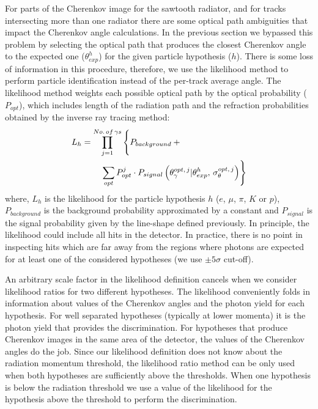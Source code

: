 \documentclass[fleqn,twoside]{article}
\begin{document}
For parts of the Cherenkov image for the sawtooth radiator, and for
tracks intersecting more than one radiator there are some
optical path ambiguities that impact the Cherenkov angle calculations.
In the previous section we bypassed this problem by selecting the optical
path that produces the closest Cherenkov angle to the expected one
($\theta^h_{exp}$) for the given particle hypothesis ($h$).
There is some loss of information in this procedure, therefore,
we use the likelihood method to perform particle identification
instead of the per-track average angle.
The likelihood method weights each possible optical path
by the optical probability ($P_{opt}$),
which includes length of the radiation path
and the refraction probabilities obtained by the inverse ray tracing method:
\begin{eqnarray*}
L_h = \prod_{j=1}^{No.\,of\,\gamma s} \left\{
P_{{background}} +  \hbox{\qquad\qquad} \phantom{\sum_{opt} P_{opt}^j} \right. \\
   \left. \sum_{opt} P_{opt}^j
    \cdot P_{{signal}}\left( \theta_\gamma^{opt,\,j} |
         \theta_{exp}^h,\,\sigma_\theta^{opt,\,j} \right) \right\}
\end{eqnarray*}
where, $L_h$ is the likelihood for the particle hypothesis $h$
($e$, $\mu$, $\pi$, $K$ or $p$), $P_{{background}}$
is the background probability approximated by a constant
and $P_{{signal}}$ is the signal probability
given by the line-shape defined previously.
In principle, the likelihood could include all hits
in the detector. In practice, there is no point in inspecting hits
which are far away from the regions where photons are expected for
at least one of the considered hypotheses (we use $\pm5\sigma$ cut-off).

An arbitrary scale factor in the likelihood definition cancels
when we consider likelihood ratios for two different hypotheses.
The likelihood conveniently folds in information about values of
the Cherenkov angles and the photon yield for each hypothesis. For
well separated hypotheses (typically at lower momenta) it is the
photon yield that provides the discrimination. For hypotheses that
produce Cherenkov images in the same area of the detector, the
values of the Cherenkov angles do the job. Since our likelihood
definition does not know about the radiation momentum threshold,
the likelihood ratio method can be only used when both hypotheses
are sufficiently above the thresholds. When one hypothesis is
below the radiation threshold we use a value of the likelihood for
the hypothesis above the threshold to perform the discrimination.
\end{document}
